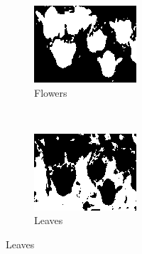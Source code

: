 \documentclass[a4paper, 12pt]{article}
\begin{document}
\begin{figure}[H]
        \centering
        \begin{subfigure}[b]{0.3\textwidth}
                \centering
                \includegraphics[width=\textwidth]{flower}
                \caption{Flowers}
                \label{fig:gull}
        \end{subfigure}%
        ~ %
        \begin{subfigure}[b]{0.3\textwidth}
                \centering
                \includegraphics[width=\textwidth]{leaves}
                \caption{Leaves}
                \label{fig:tiger}

\end{subfigure}
\end{figure}
\end{document}
